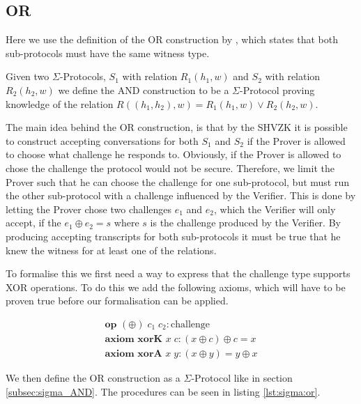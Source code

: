 \subsection{OR}
\label{subsec:sigma_OR}
Here we use the definition of the OR construction by \cite{on-sigma-protocols},
which states that both sub-protocols must have the same witness type.

Given two $\Sigma$-Protocols, $S_{1}$ with relation $R_{1}(h_{1},w)$ and
$S_{2}$ with relation $R_{2}(h_{2},w)$ we define the AND construction to be a
$\Sigma$-Protocol proving knowledge of the relation
$R((h_{1}, h_{2}), w) = R_{1}(h_{1}, w) \lor R_{2}(h_{2}, w)$.

The main idea behind the OR construction, is that by the SHVZK it is possible to
construct accepting conversations for both $S_{1}$ and $S_{2}$ if the Prover is
allowed to choose what challenge he responds to. Obviously, if the Prover is
allowed to chose the challenge the protocol would not be secure. Therefore,
we limit the Prover such that he can choose the challenge for one sub-protocol,
but must run the other sub-protocol with a challenge influenced by the Verifier.
This is done by letting the Prover chose two challenges $e_{1}$ and $e_{2}$,
which the Verifier will only accept, if the $e_{1} \oplus e_{2} = s$ where $s$
is the challenge produced by the Verifier.
By producing accepting transcripts for both sub-protocols it must be true that
he knew the witness for at least one of the relations.

To formalise this we first need a way to express that the challenge type
supports XOR operations. To do this we add the following axioms, which will have
to be proven true before our formalisation can be applied.

\begin{gather}
  \textbf{op } (\oplus) \; c_{1} \; c_{2} : \text{challenge} \label{def:op:xor} \\
  \textbf{axiom xorK } x \; c : (x \oplus c) \oplus c = x \label{axiom:xorK} \\
  \textbf{axiom xorA } x \; y : (x \oplus y) = y \oplus x \label{axiom:xorA}
\end{gather}


We then define the OR construction as a $\Sigma$-Protocol like in section
\ref{subsec:sigma_AND}. The procedures can be seen in listing \ref{lst:sigma:or}.

